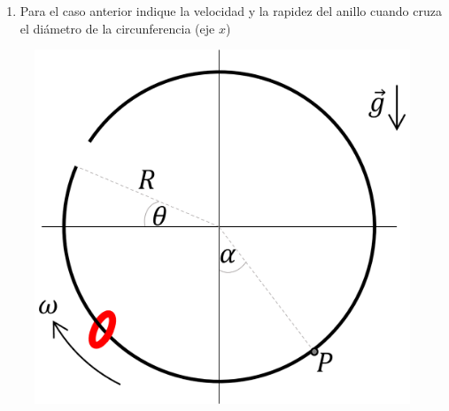 \documentclass[letterpaper,11pt]{article}
\begin{document}
\begin{enumerate}
\begin{multicols}{2}
\begin{enumerate}
        \item Para el caso anterior indique la velocidad y la rapidez del anillo cuando cruza el diámetro de la circunferencia (eje $x$)
    \end{enumerate}
    \columnbreak
    \begin{figure}[H]
        \centering
        \includegraphics[scale = 0.7]{2023-1/img/aux_3/anillo.png}
    \end{figure}
\end{multicols}


%   

\end{enumerate}
\end{document}
